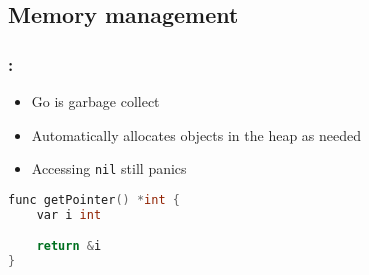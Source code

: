 \subsection{Memory management}

\begin{frame}[fragile]
    \frametitle{\secname: \small\subsecname\normalsize}

    \begin{itemize}
        \item Go is garbage collect
        \item Automatically allocates objects in the heap as needed
        \item Accessing \texttt{nil} still panics
    \end{itemize}

    \small \begin{lstlisting}[language=c]
func getPointer() *int {
    var i int

    return &i
}
    \end{lstlisting} \normalsize
\end{frame}
